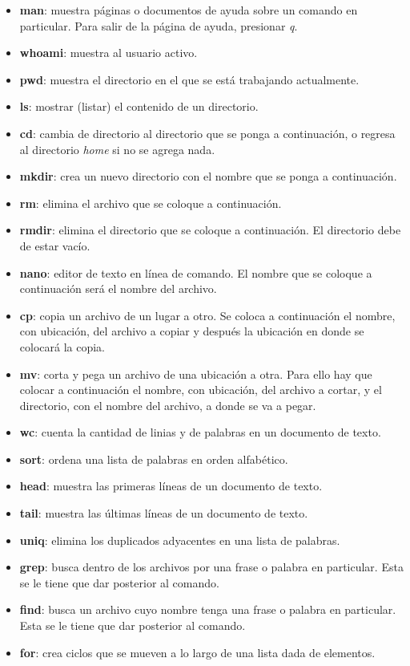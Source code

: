 \documentclass[10pt,letterpaper]{article}
\begin{document}
\begin{itemize}
\item \textbf{man}: muestra p\'aginas o documentos de ayuda sobre un comando en particular. Para salir de la p\'agina de ayuda, presionar \emph{q}.
\item \textbf{whoami}: muestra al usuario activo.
\item \textbf{pwd}: muestra el directorio en el que se est\'a trabajando actualmente.
\item \textbf{ls}: mostrar (listar) el contenido de un directorio.
\item \textbf{cd}: cambia de directorio al directorio que se ponga a continuaci\'on, o regresa al directorio \emph{home} si no se agrega nada.
\item \textbf{mkdir}: crea un nuevo directorio con el nombre que se ponga a continuaci\'on.
\item \textbf{rm}: elimina el archivo que se coloque a continuaci\'on.
\item \textbf{rmdir}: elimina el directorio que se coloque a continuaci\'on. El directorio debe de estar vac\'io.
\item \textbf{nano}: editor de texto en l\'inea de comando. El nombre que se coloque a continuaci\'on ser\'a el nombre del archivo.
\item \textbf{cp}: copia un archivo de un lugar a otro. Se coloca a continuaci\'on el nombre, con ubicaci\'on, del archivo a copiar y despu\'es la ubicaci\'on en donde se colocar\'a la copia.
\item \textbf{mv}: corta y pega un archivo de una ubicaci\'on a otra. Para ello hay que colocar a continuaci\'on el nombre, con ubicaci\'on, del archivo a cortar, y el directorio, con el nombre del archivo, a donde se va a pegar.
\item \textbf{wc}: cuenta la cantidad de linias y de palabras en un documento de texto.
\item \textbf{sort}: ordena una lista de palabras en orden alfab\'etico.
\item \textbf{head}: muestra las primeras l\'ineas de un documento de texto.
\item \textbf{tail}: muestra las \'ultimas l\'ineas de un documento de texto.
\item \textbf{uniq}: elimina los duplicados adyacentes en una lista de palabras.
\item \textbf{grep}: busca dentro de los archivos por una frase o palabra en particular. Esta se le tiene que dar posterior al comando.
\item \textbf{find}: busca un archivo cuyo nombre tenga una frase o palabra en particular. Esta se le tiene que dar posterior al comando.
\item \textbf{for}: crea ciclos que se mueven a lo largo de una lista dada de elementos.
\end{itemize}
\end{document}
